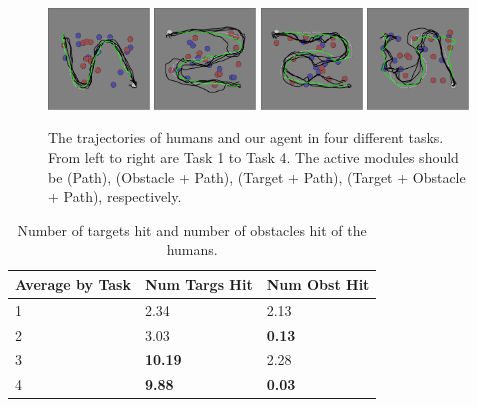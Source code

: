 \documentclass[11pt]{article} %
\begin{document}
\begin{figure}[h!]
\centering
\includegraphics[width=0.24\textwidth]{task_1.png}
\includegraphics[width=0.24\textwidth]{task_2.png}
\includegraphics[width=0.24\textwidth]{task_3.png}
\includegraphics[width=0.24\textwidth]{task_4.png}
\caption{The trajectories of humans and our agent in four different tasks. From
left to right are Task 1 to Task 4. The active modules should be (Path),
(Obstacle + Path), (Target + Path), (Target + Obstacle + Path), respectively.}
\label{fig:exp}
\end{figure}

\begin{table}[h!]
\centering
\begin{tabular}{| l| l| l |}
\hline
Average by Task & Num Targs Hit & Num Obst Hit\\
\hline
1 & 2.34 &  2.13\\
\hline
2 & 3.03 &  \bf{0.13}\\
\hline
3 & \bf{10.19} & 2.28\\
\hline
4 & \bf{9.88} &  \bf{0.03}\\
\hline
\end{tabular}
\caption{Number of targets hit and number of obstacles hit of the humans.}
\label{tb:human}
\end{table}
\end{document}
